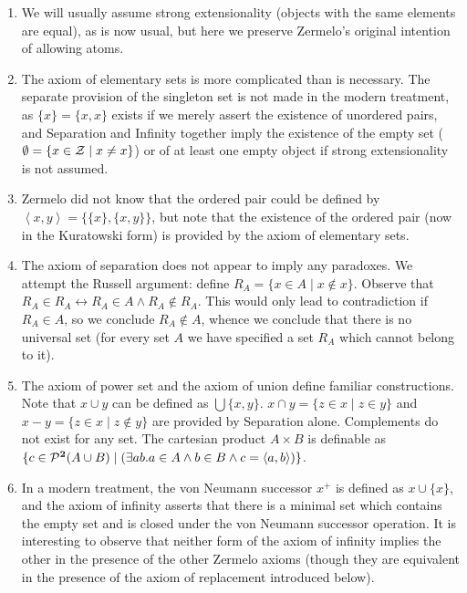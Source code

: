 \documentclass[12pt]{book}
\begin{document}
\begin{enumerate}

\item We will usually assume strong extensionality (objects with the same elements
are equal), as is now usual, but here we preserve Zermelo's original intention of allowing atoms.

\item The axiom of elementary sets is more complicated than is necessary.  The
separate provision of the singleton set is not made in the modern
treatment, as $\{x\} = \{x,x\}$ exists if we merely assert the
existence of unordered pairs, and Separation and Infinity together
imply the existence of the empty set ($\emptyset = \{x \in {\cal Z}\mid x
\neq x\}$) or of at least one empty object if strong extensionality is not assumed.

\item Zermelo did not know that the ordered pair could be defined by
$\left<x,y\right> = \{\{x\},\{x,y\}\}$, but note that the existence of the ordered pair
(now in the Kuratowski form) is provided by the axiom of elementary sets.

\item The axiom of separation does not appear to imply any paradoxes.  We
attempt the Russell argument: define $R_A = \{x \in A \mid x \not\in
x\}$.  Observe that $R_A \in R_A \leftrightarrow R_A \in A \wedge R_A \not\in
R_A$.  This would only lead to contradiction if $R_A \in A$, so we
conclude $R_A \not\in A$, whence we conclude that there is no
universal set (for every set $A$ we have specified a set $R_A$ which
cannot belong to it).

\item The axiom of power set and the axiom of union define familiar
constructions.  Note that $x \cup y$ can be defined as $\bigcup
\{x,y\}$.  $x \cap y = \{z \in x \mid z \in y\}$ and $x-y = \{z \in x
\mid z \not\in y\}$ are provided by Separation alone.  Complements do
not exist for any set.  The cartesian product $A \times B$ is
definable as $\{c \in {\cal P}^{\bf 2}(A \cup B) \mid (\exists ab.a\in A
\wedge b \in B \wedge c=\left<a,b\right>)\}$.



\item In a modern treatment, the von Neumann successor $x^+$ is defined as
$x \cup \{x\}$, and the axiom of infinity asserts that there is a
minimal set which contains the empty set and is closed under the von Neumann
successor operation.  It is interesting to observe that neither form
of the axiom of infinity implies the other in the presence of the
other Zermelo axioms (though they are equivalent in the presence of
the axiom of replacement introduced below).


\end{enumerate}
\end{document}
